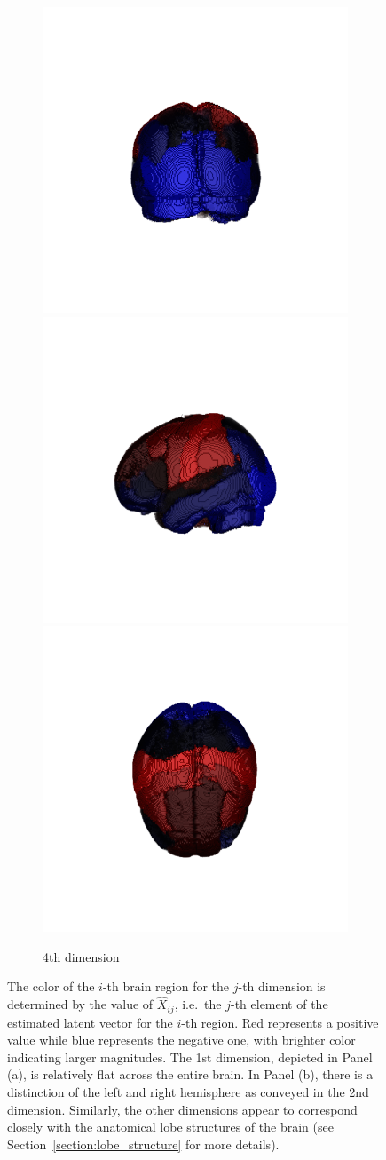 \documentclass[journal,twoside,web]{ieeecolor}
\begin{document}
\begin{figure}
\begin{subfigure}[t]{0.95\linewidth}
\end{subfigure}
\begin{subfigure}[t]{0.95\linewidth}
\caption{4th dimension}
\vspace{-7pt}
\centering
  \includegraphics[trim={5cm 5cm  4cm  4cm },clip,height=.3\linewidth]{desikan4a.png}\hspace{-10pt}
  \includegraphics[trim={5cm 5cm  4cm  4cm },clip,height=.3\linewidth]{desikan4b.png}\hspace{-10pt}
  \includegraphics[trim={5cm 5cm  4cm  4cm },clip,height=.3\linewidth]{desikan4c.png}
\end{subfigure}
\caption{
The color of the $i$-th brain region for the $j$-th dimension is determined by the value of $\hat{X}_{ij}$, i.e.\ the $j$-th element of the estimated latent vector for the $i$-th region. Red represents a positive value while blue represents the negative one, with brighter color indicating larger magnitudes.
The 1st dimension, depicted in Panel (a), is relatively flat across the entire brain. 
In Panel (b), there is a distinction of the left and right hemisphere as conveyed in the 2nd dimension. Similarly, the other dimensions appear to correspond closely with the anatomical lobe structures of the brain (see Section~\ref{section:lobe_structure} for more details).}
\label{fig:eigenvector_brain}
\end{figure}
\end{document}
